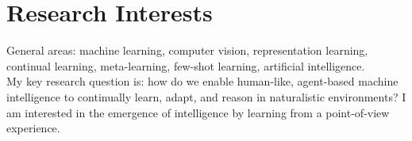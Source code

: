 \section{\sc Research Interests}
General areas: machine learning, computer vision, representation learning, continual learning, meta-learning, few-shot learning, artificial intelligence.\\
My key research question is: how do we enable human-like, agent-based machine
intelligence to continually learn, adapt, and reason in naturalistic
environments? I am interested in the emergence of intelligence by learning from
a point-of-view experience. 
